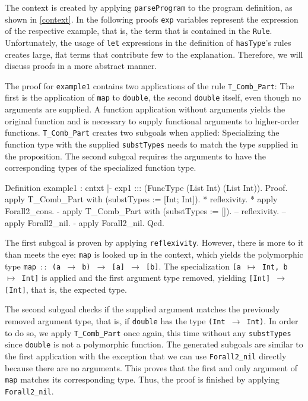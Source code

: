 \documentclass[paper = a4, fleqn, twoside]{scrreprt}
\begin{document}
The context is created by applying \texttt{parseProgram} to the program definition, as shown in \autoref{context}. In the following proofs \texttt{exp} variables represent the expression of the respective example, that is, the term that is contained in the \texttt{Rule}. Unfortunately, the usage of \texttt{let} expressions in the definition of \texttt{hasType}'s rules creates large, flat terms that contribute few to the explanation. Therefore, we will discuss proofs in a more abstract manner.\\ 
\par \noindent
The proof for \texttt{example1} contains two applications of the rule \texttt{T\_Comb\_Part}: The first is the application of \texttt{map} to \texttt{double}, the second \texttt{double} itself, even though no arguments are supplied. A function application without arguments yields the original function and is necessary to supply functional arguments to higher-order functions. \texttt{T\_Comb\_Part} creates two subgoals when applied: Specializing the function type with the supplied \texttt{substTypes} needs to match the type supplied in the proposition. The second subgoal requires the arguments to have the corresponding types of the specialized function type.
\begin{coqcode}
Definition example1 : cntxt |- exp1 ::: (FuncType (List Int) (List Int)).
Proof.
  apply T_Comb_Part with (substTypes := [Int; Int]).
  * reflexivity.
  * apply Forall2_cons.
    - apply T_Comb_Part with (substTypes := []).
      -- reflexivity.
      -- apply Forall2_nil.
    - apply Forall2_nil.
Qed.
\end{coqcode}
The first subgoal is proven by applying \texttt{reflexivity}. However, there is more to it than meets the eye: \texttt{map} is looked up in the context, which yields the polymorphic type \texttt{\mbox{map $::$} (a $\rightarrow$ b) $\rightarrow$ [a] $\rightarrow$ [b]}. The specialization \texttt{[a $\mapsto$ Int, b $\mapsto$ Int]} is applied and the first argument type removed, yielding \texttt{[Int] $\rightarrow$ [Int]}, that is, the expected type.
\par
The second subgoal checks if the supplied argument matches the previously removed argument type, that is, if \texttt{double} has the type \texttt{(Int $\rightarrow$ Int)}. In order to do so, we apply \texttt{T\_Comb\_Part} once again, this time without any \texttt{substTypes} since \texttt{double} is not a polymorphic function. The generated subgoals are similar to the first application with the exception that we can use \texttt{Forall2\_nil} directly because there are no arguments. This proves that the first and only argument of \texttt{map} matches its corresponding type. Thus, the proof is finished by applying \texttt{Forall2\_nil}.
\end{document}
